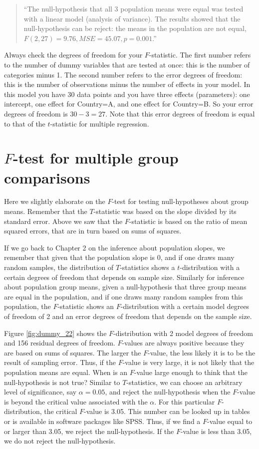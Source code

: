 \documentclass[]{report}\usepackage[]{graphicx}\usepackage[]{color}
\begin{document}
\begin{quote}
``The null-hypothesis that all 3 population means were equal was tested with a linear model (analysis of variance). The results showed that the null-hypothesis can be reject: the means in the population are not equal, $F(2, 27)=9.76, MSE=45.07 , p = 0.001$.''
\end{quote}

Always check the degrees of freedom for your $F$-statistic. The first number refers to the number of dummy variables that are tested at once: this is the number of categories minus 1. The second number refers to the error degrees of freedom: this is the number of observations minus the number of effects in your model. In this model you have 30 data points and you have three effects (parameters): one intercept, one effect for Country=A, and one effect for Country=B. So your error degrees of freedom is $30-3=27$. Note that this error degrees of freedom is equal to that of the $t$-statistic for multiple regression.



\section{$F$-test for multiple group comparisons}

Here we slightly elaborate on the $F$-test for testing null-hypotheses about group means. Remember that the $T$-statistic was based on the slope divided by its standard error. Above we saw that the $F$-statistic is based on the ratio of mean squared errors, that are in turn based on sums of squares. 

If we go back to Chapter 2 on the inference about population slopes, we remember that given that the population slope is 0, and if one draws many random samples, the distribution of $T$-statistics shows a $t$-distribution with a certain degrees of freedom that depends on sample size. Similarly for inference about population group means, given a null-hypothesis that three group means are equal in the population, and if one draws many random samples from this population, the $F$-statistic shows an $F$-distribution with a certain model degrees of freedom of 2 and an error degrees of freedom that depends on the sample size.

Figure \ref{fig:dummy_22} shows the $F$-distribution with 2 model degrees of freedom and 156 residual degrees of freedom. $F$-values are always positive because they are based on sums of squares. The larger the $F$-value, the less likely it is to be the result of sampling error. Thus, if the $F$-value is very large, it is not likely that the population means are equal. When is an $F$-value large enough to think that the null-hypothesis is not true? Similar to $T$-statistics, we can choose an arbitrary level of significance, say $\alpha=0.05$, and reject the null-hypothesis when the $F$-value is beyond the critical value associated with the $\alpha$. For this particular $F$-distribution, the critical $F$-value is 3.05. This number can be looked up in tables or is available in software packages like SPSS. Thus, if we find a $F$-value equal to or larger than 3.05, we reject the null-hypothesis. If the $F$-value is less than 3.05, we do not reject the null-hypothesis. 
\end{document}
